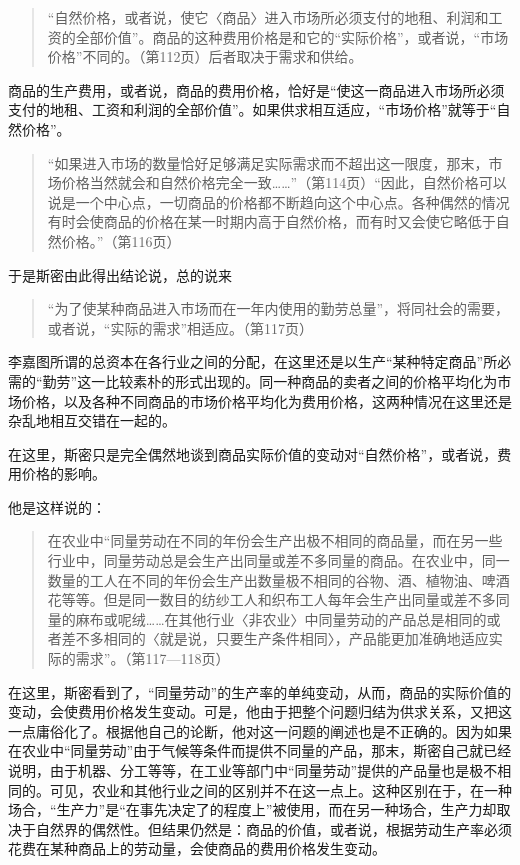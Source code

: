 \begin{quote}{“自然价格，或者说，使它〈商品〉进入市场所必须支付的地租、利润和工资的全部价值”。商品的这种费用价格是和它的“实际价格”，或者说，“市场价格”不同的。（第112页）后者取决于需求和供给。}\end{quote}

商品的生产费用，或者说，商品的费用价格，恰好是“使这一商品进入市场所必须支付的地租、工资和利润的全部价值”。如果供求相互适应，“市场价格”就等于“自然价格”。

\begin{quote}{“如果进入市场的数量恰好足够满足实际需求而不超出这一限度，那末，市场价格当然就会和自然价格完全一致……”（第114页）“因此，自然价格可以说是一个中心点，一切商品的价格都不断趋向这个中心点。各种偶然的情况有时会使商品的价格在某一时期内高于自然价格，而有时又会使它略低于自然价格。”（第116页）}\end{quote}

于是斯密由此得出结论说，总的说来

\begin{quote}{“为了使某种商品进入市场而在一年内使用的勤劳总量”，将同社会的需要，或者说，“实际的需求”相适应。（第117页）}\end{quote}

李嘉图所谓的总资本在各行业之间的分配，在这里还是以生产“某种特定商品”所必需的“勤劳”这一比较素朴的形式出现的。同一种商品的卖者之间的价格平均化为市场价格，以及各种不同商品的市场价格平均化为费用价格，这两种情况在这里还是杂乱地相互交错在一起的。

在这里，斯密只是完全偶然地谈到商品实际价值的变动对“自然价格”，或者说，费用价格的影响。

他是这样说的：

\begin{quote}{在农业中“同量劳动在不同的年份会生产出极不相同的商品量，而在另一些行业中，同量劳动总是会生产出同量或差不多同量的商品。在农业中，同一数量的工人在不同的年份会生产出数量极不相同的谷物、酒、植物油、啤酒花等等。但是同一数目的纺纱工人和织布工人每年会生产出同量或差不多同量的麻布或呢绒……在其他行业〈非农业〉中同量劳动的产品总是相同的或者差不多相同的〈就是说，只要生产条件相同〉，产品能更加准确地适应实际的需求”。（第117—118页）}\end{quote}

在这里，斯密看到了，“同量劳动”的生产率的单纯变动，从而，商品的实际价值的变动，会使费用价格发生变动。可是，他由于把整个问题归结为供求关系，又把这一点庸俗化了。根据他自己的论断，他对这一问题的阐述也是不正确的。因为如果在农业中“同量劳动”由于气候等条件而提供不同量的产品，那末，斯密自己就已经说明，由于机器、分工等等，在工业等部门中“同量劳动”提供的产品量也是极不相同的。可见，农业和其他行业之间的区别并不在这一点上。这种区别在于，在一种场合，“生产力”是“在事先决定了的程度上”被使用，而在另一种场合，生产力却取决于自然界的偶然性。但结果仍然是：商品的价值，或者说，根据劳动生产率必须花费在某种商品上的劳动量，会使商品的费用价格发生变动。


